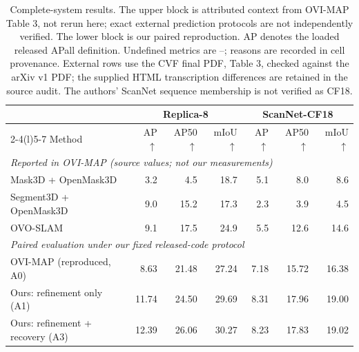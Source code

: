 \begin{table}[!ht]
\centering
\caption{Complete-system results. The upper block is attributed context from OVI-MAP Table 3, not rerun here; exact external prediction protocols are not independently verified. The lower block is our paired reproduction. AP denotes the loaded released APall definition. Undefined metrics are --; reasons are recorded in cell provenance. External rows use the CVF final PDF, Table 3, checked against the arXiv v1 PDF; the supplied HTML transcription differences are retained in the source audit. The authors' ScanNet sequence membership is not verified as CF18.}
\label{tab:main}
\fontsize{9}{10.5}\selectfont
\setlength{\tabcolsep}{5pt}
\begin{tabular*}{\textwidth}{@{\extracolsep{\fill}}lrrrrrr@{}}
\toprule
& \multicolumn{3}{c}{Replica-8} & \multicolumn{3}{c}{ScanNet-CF18} \\
\cmidrule(lr){2-4}\cmidrule(l){5-7}
Method & AP$\uparrow$ & AP50$\uparrow$ & mIoU$\uparrow$ & AP$\uparrow$ & AP50$\uparrow$ & mIoU$\uparrow$ \\
\midrule
\multicolumn{7}{l}{\emph{Reported in OVI-MAP (source values; not our measurements)}}\\
Mask3D + OpenMask3D & 3.2 & 4.5 & 18.7 & 5.1 & 8.0 & 8.6 \\
Segment3D + OpenMask3D & 9.0 & 15.2 & 17.3 & 2.3 & 3.9 & 4.5 \\
OVO-SLAM & 9.1 & 17.5 & 24.9 & 5.5 & 12.6 & 14.6 \\
\midrule
\multicolumn{7}{l}{\emph{Paired evaluation under our fixed released-code protocol}}\\
OVI-MAP (reproduced, A0) & 8.63 & 21.48 & 27.24 & 7.18 & 15.72 & 16.38 \\
Ours: refinement only (A1) & 11.74 & 24.50 & 29.69 & 8.31 & 17.96 & 19.00 \\
Ours: refinement + recovery (A3) & 12.39 & 26.06 & 30.27 & 8.23 & 17.83 & 19.02 \\
\bottomrule
\end{tabular*}
\end{table}
